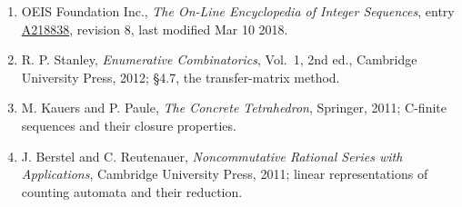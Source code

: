 \documentclass[11pt]{article}
\theoremstyle{definition}
\begin{document}
\begin{enumerate}

\item OEIS Foundation Inc., \emph{The On-Line Encyclopedia of Integer Sequences}, entry \href{https://oeis.org/A218838}{A218838}, revision 8, last modified Mar 10 2018.

\item R. P. Stanley, \emph{Enumerative Combinatorics}, Vol.~1, 2nd ed., Cambridge University Press, 2012; \S4.7, the transfer-matrix method.

\item M. Kauers and P. Paule, \emph{The Concrete Tetrahedron}, Springer, 2011; C-finite sequences and their closure properties.

\item J. Berstel and C. Reutenauer, \emph{Noncommutative Rational Series with Applications}, Cambridge University Press, 2011; linear representations of counting automata and their reduction.

\end{enumerate}
\end{document}
